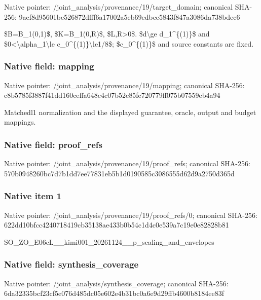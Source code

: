 \documentclass[10pt,a4paper]{article}
\begin{document}
Native pointer: /joint\_analysis/provenan\allowbreak{}ce/19/target\_domain; canonical SHA-256: 9aef8d95601be526872dfff6\allowbreak{}a17002a5eb69edbce5843f84\allowbreak{}7a3086da738bdec6


\$B=B\_1(0,1)\$, \$K=B\_1(0,R)\$, \$L,R>0\$. \$d\textbackslash{}ge d\_1\textasciicircum{}\{(1)\}\$ and \$0<\textbackslash{}alpha\_1\textbackslash{}le c\_0\textasciicircum{}\{(1)\}\textbackslash{}le1/8\$; \$c\_0\textasciicircum{}\{(1)\}\$ and source constants are fixed.


\subsubsection{Native field: mapping}


Native pointer: /joint\_analysis/provenance/19/mapping; canonical SHA-256: c8b5785f3887f41dd160ceff\allowbreak{}a648c4c07b52c85fe720779f\allowbreak{}f075b07559eb4a94


Matchedl1 normalization and the displayed guarantee, oracle, output and budget mappings.


\subsubsection{Native field: proof\_refs}


Native pointer: /joint\_analysis/provenan\allowbreak{}ce/19/proof\_refs; canonical SHA-256: 570b0948260bc7d7b1dd7ee7\allowbreak{}7831eb5b1d0190585c308655\allowbreak{}5d62d9a2750d365d



\subsubsection{Native item 1}


Native pointer: /joint\_analysis/provenan\allowbreak{}ce/19/proof\_refs/0; canonical SHA-256: 622dd10bfcc4240718419cb3\allowbreak{}5138ae433b0b54c1d4c0e539\allowbreak{}a7c19e0e82828b81


SO\_ZO\_E06cL\_\_kimi001\_202\allowbreak{}61124\_\_p\_scaling\_and\_env\allowbreak{}elopes


\subsubsection{Native field: synthesis\_coverage}


Native pointer: /joint\_analysis/synthesis\_coverage; canonical SHA-256: 6da32335bcf23cf5e076d485\allowbreak{}dc05e602e4b31bc0a6e9d29f\allowbreak{}fb4600b8184ee83f
\end{document}

